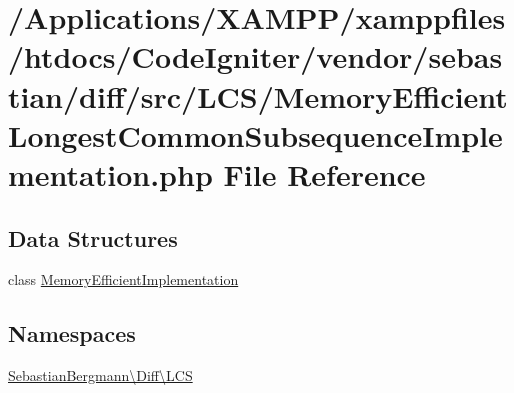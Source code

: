\hypertarget{_memory_efficient_longest_common_subsequence_implementation_8php}{}\section{/\+Applications/\+X\+A\+M\+P\+P/xamppfiles/htdocs/\+Code\+Igniter/vendor/sebastian/diff/src/\+L\+C\+S/\+Memory\+Efficient\+Longest\+Common\+Subsequence\+Implementation.php File Reference}
\label{_memory_efficient_longest_common_subsequence_implementation_8php}
\subsection*{Data Structures}
\begin{DoxyCompactItemize}
\item 
class \mbox{\hyperlink{class_sebastian_bergmann_1_1_diff_1_1_l_c_s_1_1_memory_efficient_implementation}{Memory\+Efficient\+Implementation}}
\end{DoxyCompactItemize}
\subsection*{Namespaces}
\begin{DoxyCompactItemize}
\item 
 \mbox{\hyperlink{namespace_sebastian_bergmann_1_1_diff_1_1_l_c_s}{Sebastian\+Bergmann\textbackslash{}\+Diff\textbackslash{}\+L\+CS}}
\end{DoxyCompactItemize}
